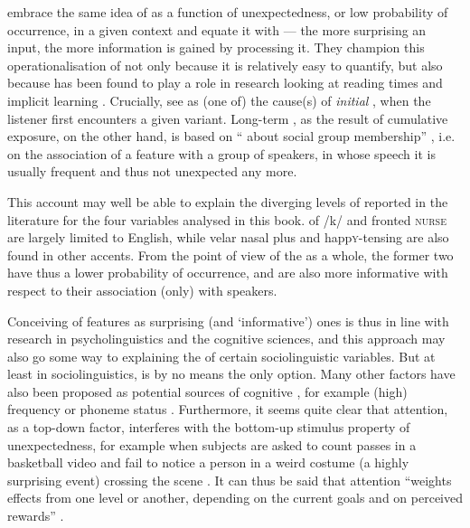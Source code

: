 \textcite[cf.][37]{jaegeretal2017} embrace the same idea of  as a function of unexpectedness, or low probability of occurrence, in a given context and equate it with  --- the more surprising an input, the more information is gained by processing it.
They champion this operationalisation of  not only because it is relatively easy to quantify, but also because  has been found to play a role in research looking at reading times and implicit learning \parencite[cf.][37]{jaegeretal2017}.
Crucially, \citeauthor{jaegeretal2017} see  as (one of) the cause(s) of \emph{initial} , when the listener first encounters a given variant.
Long-term , as the result of cumulative exposure, on the other hand, is based on \enquote{ about social group membership} \parencite[38]{jaegeretal2017}, i.e. on the association of a feature with a group of speakers, in whose speech it is usually frequent and thus not unexpected any more.

This account may well be able to explain the diverging levels of  reported in the literature for the four variables analysed in this book.
 of /k/ and fronted \textsc{nurse} are largely limited to  English, while velar nasal plus and happ\textsc{y}-tensing are also found in other accents.
From the point of view of the  as a whole, the former two have thus a lower probability of occurrence, and are also more informative with respect to their association (only) with  speakers.

Conceiving of  features as surprising (and `informative') ones is thus in line with research in psycholinguistics and the cognitive sciences, and this approach may also go some way to explaining the  of certain sociolinguistic variables. 
But at least in sociolinguistics,  is by no means the only option.
Many other factors have also been proposed as potential sources of cognitive , for example (high) frequency or phoneme status \parencite[cf.][8]{auer2014}.
Furthermore, it seems quite clear that attention, as a top-down factor, interferes with the bottom-up stimulus property of unexpectedness, for example when subjects are asked to count passes in a basketball video and fail to notice a person in a weird costume (a highly surprising event) crossing the scene \parencite[cf.][8]{zarconeetal2017}.
It can thus be said that attention \enquote{weights  effects from one level or another, depending on the current goals and on perceived rewards} \parencite[8]{zarconeetal2017}.


